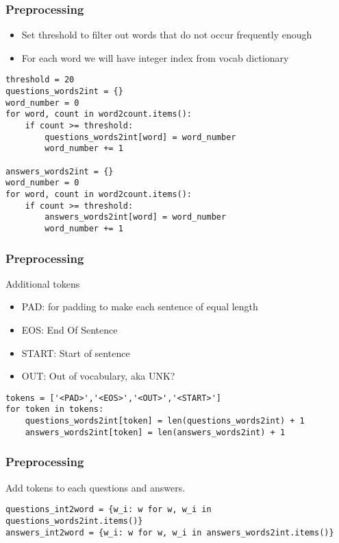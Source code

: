 \begin{frame}[fragile]\frametitle{Preprocessing}
\begin{itemize}
\item Set threshold to filter out words that do not occur frequently enough
\item For each word we will have integer index from vocab dictionary
\end{itemize}

\begin{lstlisting}
threshold = 20
questions_words2int = {}
word_number = 0
for word, count in word2count.items():
    if count >= threshold:
        questions_words2int[word] = word_number
        word_number += 1
        
answers_words2int = {}
word_number = 0
for word, count in word2count.items():
    if count >= threshold:
        answers_words2int[word] = word_number
        word_number += 1
\end{lstlisting}
\end{frame}

\begin{frame}[fragile]\frametitle{Preprocessing}
Additional tokens
\begin{itemize}
\item PAD: for padding to make each sentence of equal length
\item EOS: End Of Sentence
\item START: Start of sentence
\item OUT: Out of vocabulary, aka UNK?
\end{itemize}

\begin{lstlisting}
tokens = ['<PAD>','<EOS>','<OUT>','<START>']    
for token in tokens:
    questions_words2int[token] = len(questions_words2int) + 1
    answers_words2int[token] = len(answers_words2int) + 1
\end{lstlisting}
\end{frame}

\begin{frame}[fragile]\frametitle{Preprocessing}
Add tokens to each questions and answers.
\begin{lstlisting}
questions_int2word = {w_i: w for w, w_i in questions_words2int.items()}
answers_int2word = {w_i: w for w, w_i in answers_words2int.items()}
\end{lstlisting}
\end{frame}

